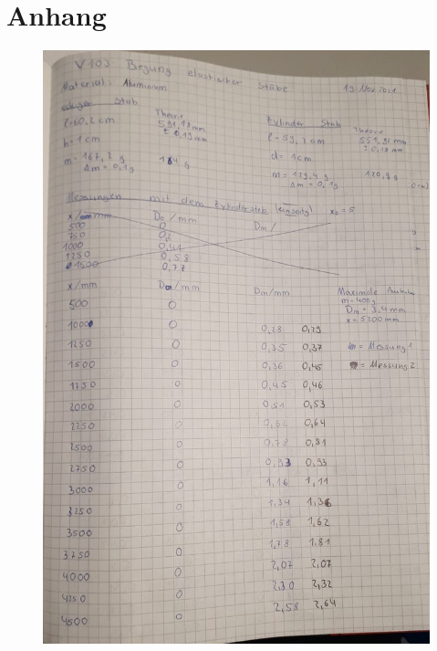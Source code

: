 \section{Anhang}\label{sec:Anhang}
\begin{figure}[h]
   \centering
    \includegraphics[scale=0.45]{content/KladdeS1.jpeg}
\end{figure}
\pagebreak
